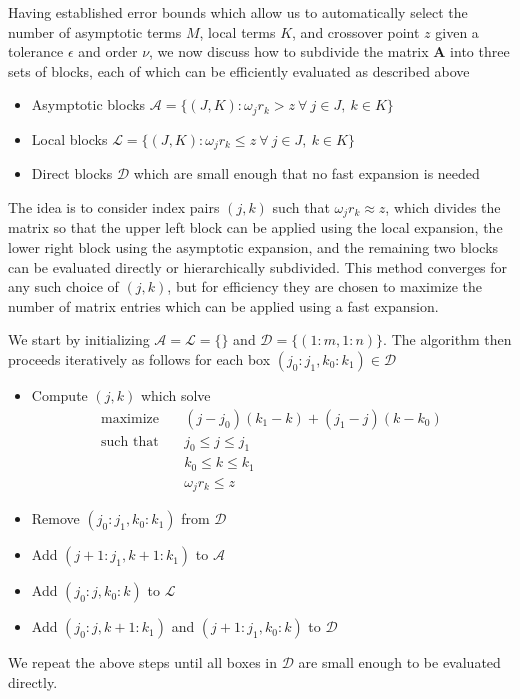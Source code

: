 Having established error bounds which allow us to automatically select the
number of asymptotic terms $M$, local terms $K$, and crossover point $z$ given a
tolerance $\epsilon$ and order $\nu$, we now discuss how to subdivide the matrix
$\bm{A}$ into three sets of blocks, each of which can be efficiently evaluated
as described above
\begin{itemize}
    \item Asymptotic blocks $\mathscr{A} = \big\{ (J, K) : \omega_j r_k > z \
    \forall \ j \in J, \ k \in K \big\}$
    \item Local blocks $\mathscr{L} = \big\{ (J, K) : \omega_j r_k \leq z \
    \forall \ j \in J, \ k \in K \big\}$
    \item Direct blocks $\mathscr{D}$ which are small enough that no fast
    expansion is needed
\end{itemize}
The idea is to consider index pairs $(j,k)$ such that $\omega_j r_k \approx z$,
which divides the matrix so that the upper left block can be applied using the
local expansion, the lower right block using the asymptotic expansion, and the
remaining two blocks can be evaluated directly or hierarchically subdivided.
This method converges for any such choice of $(j,k)$, but for efficiency they
are chosen to maximize the number of matrix entries which can be applied using a
fast expansion.

We start by initializing $\mathscr{A} = \mathscr{L} = \{\}$ and $\mathscr{D} =
\{(1:m, 1:n)\}$. The algorithm then proceeds iteratively as follows for each box
$(j_0:j_1, k_0:k_1) \in \mathscr{D}$
\begin{itemize}
    \item Compute $(j,k)$ which solve
    \begin{align}
        \text{maximize} &\quad (j-j_0)(k_1-k) + (j_1-j)(k-k_0) \\
        \text{such that} &\quad j_0 \leq j \leq j_1 \\ 
        &\quad k_0 \leq k \leq k_1 \\ 
        &\quad \omega_j r_k \leq z
    \end{align}
    \item Remove $(j_0:j_1, k_0:k_1)$ from $\mathscr{D}$
    \item Add $(j+1:j_1, k+1:k_1)$ to $\mathscr{A}$ 
    \item Add $(j_0:j, k_0:k)$ to $\mathscr{L}$ 
    \item Add $(j_0:j, k+1:k_1)$ and $(j+1:j_1, k_0:k)$ to $\mathscr{D}$ 
\end{itemize}
We repeat the above steps until all boxes in $\mathscr{D}$ are small enough to
be evaluated directly.

